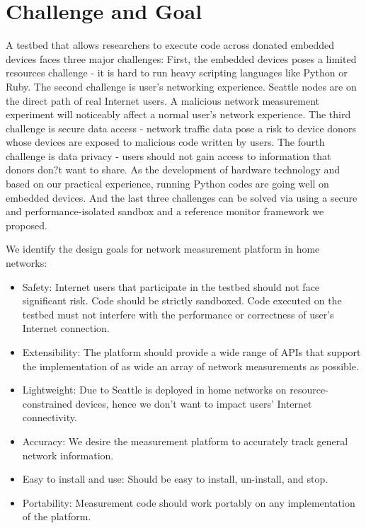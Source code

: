 \section{Challenge and Goal}
\label{sec.goal}
A testbed that allows researchers to execute code across donated embedded devices faces three major challenges: First, the embedded devices poses a limited resources challenge - it is hard to run heavy scripting languages like Python or Ruby. The second challenge is user's networking experience. Seattle nodes are on the direct path of real Internet users. A malicious network measurement experiment will noticeably affect a normal user's network experience. The third challenge is secure data access - network traffic data pose a risk to device donors whose devices are exposed to malicious code written by users. The fourth challenge is data privacy - users should not gain access to information that donors don?t want to share. As the development of hardware technology and based on our practical experience, running Python codes are going well on embedded devices. And the last three challenges can be solved via using a secure and performance-isolated sandbox and a reference monitor framework we proposed.

We identify the design goals for network measurement platform in home networks:
\begin{itemize}
\item Safety: Internet users that participate in the testbed should not face significant risk. Code should be strictly sandboxed. Code executed on the testbed must not interfere with the performance or correctness of user's Internet connection.
\item Extensibility: The platform should provide a wide range of APIs that support the implementation of as wide an array of network measurements as possible.
\item Lightweight: Due to Seattle is deployed in home networks on resource-constrained devices, hence we don't want to impact users' Internet connectivity.
\item Accuracy: We desire the measurement platform to accurately track general network information. 
\item Easy to install and use: Should be easy to install, un-install, and stop. 
\item Portability: Measurement code should work portably on any implementation of the platform.
\end{itemize}

